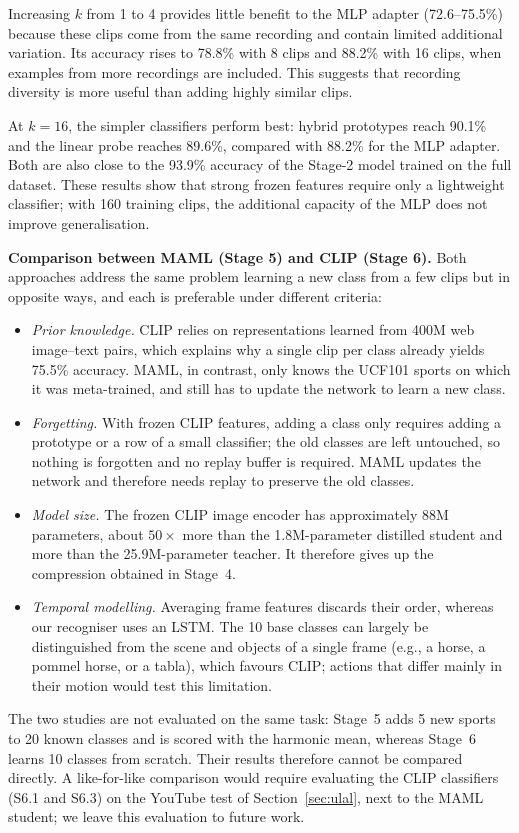 \documentclass[conference]{IEEEtran}
\begin{document}
Increasing $k$ from 1 to 4 provides little benefit to the MLP adapter (72.6--75.5\%) because
these clips come from the same recording and contain limited additional variation. Its
accuracy rises to 78.8\% with 8 clips and 88.2\% with 16 clips, when examples from more
recordings are included. This suggests that recording diversity is more useful than adding
highly similar clips.

At $k=16$, the simpler classifiers perform best: hybrid prototypes reach 90.1\% and the
linear probe reaches 89.6\%, compared with 88.2\% for the MLP adapter. Both are also close
to the 93.9\% accuracy of the Stage-2 model trained on the full dataset. These results show
that strong frozen features require only a lightweight classifier; with 160 training
clips, the additional capacity of the MLP does not improve generalisation.

\textbf{Comparison between MAML (Stage 5) and CLIP (Stage 6).} Both approaches address the same
problem learning a new class from a few clips but in opposite ways, and each is preferable under
different criteria:
\begin{itemize}
\item \emph{Prior knowledge.} CLIP relies on representations learned from 400M web image--text pairs,
which explains why a single clip per class already yields 75.5\% accuracy. MAML, in contrast, only knows
the UCF101 sports on which it was meta-trained, and still has to update the network to learn a new class.
\item \emph{Forgetting.} With frozen CLIP features, adding a class only requires adding a prototype or a
row of a small classifier; the old classes are left untouched, so nothing is forgotten and no replay
buffer is required. MAML updates the network and therefore needs replay to preserve the old classes.
\item \emph{Model size.} The frozen CLIP image encoder has approximately 88M parameters, about $50\times$
more than the 1.8M-parameter distilled student and more than the 25.9M-parameter teacher. It therefore
gives up the compression obtained in Stage~4.
\item \emph{Temporal modelling.} Averaging frame features discards their order, whereas our recogniser uses
an LSTM. The 10 base classes can largely be distinguished from the scene and objects of a single frame
(e.g., a horse, a pommel horse, or a tabla), which favours CLIP; actions that differ mainly in their motion
would test this limitation.
\end{itemize}
The two studies are not evaluated on the same task: Stage~5 adds 5 new sports to 20 known classes and is
scored with the harmonic mean, whereas Stage~6 learns 10 classes from scratch. Their results therefore
cannot be compared directly. A like-for-like comparison would require evaluating the CLIP classifiers
(S6.1 and S6.3) on the YouTube test of Section~\ref{sec:ulal}, next to the MAML student; we leave this
evaluation to future work.
\end{document}
